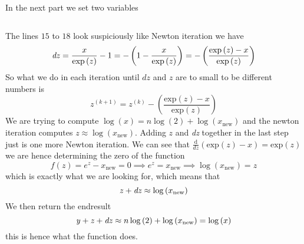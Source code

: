 \documentclass{article}
\begin{document}
\noindent In the next part we set two variables 
\begin{lstlisting}[language=C++,
                   directivestyle={\color{black}}
                   emph={int,char,double,float,unsigned},
                   emphstyle={\color{blue}}
                  ]

\end{lstlisting}
The lines $15$ to $18$ look suspiciously like Newton iteration we have
\begin{equation*}
    \text{\textit{dz}} = \frac{x}{\text{exp}\left(z\right)} - 1 = - \left(1-\frac{x}{\text{exp}\left(z\right)}\right) = -\left(\frac{\text{exp}\left(z\right) - x}{\text{exp}\left(z\right)}\right)
\end{equation*}
So what we do in each iteration until $dz$ and $z$ are to small to be different numbers is
\begin{equation*}
    z^{\left(k+1\right)} = z^{\left(k\right)} - \left(\frac{\text{exp}\left(z\right) - x}{\text{exp}\left(z\right)}\right)
\end{equation*}
We are trying to compute $\log\left(x\right) = n \log\left(2\right) + \log\left(x_{\text{new}}\right)$ and the newton iteration computes $z \approx \log\left(x_{\text{new}}\right)$. Adding $z$ and \textit{dz} together in the last step just is one more Newton iteration. We can see that $\frac{\mathrm{d}}{dz}\left(\text{exp}\left(z\right) - x\right) = \text{exp}\left(z\right)$ we are hence determining the zero of the function
\begin{equation*}
    f\left(z\right) = e^{z} - x_{\text{new}} = 0 \implies e^{z} = x_{\text{new}} \implies \log\left(x_{\text{new}}\right) = z
\end{equation*}
which is exactly what we are looking for, which means that 
\begin{equation*}
    \text{\textit{z}} + \text{\textit{dz}} \approx \log\left(x_{\text{new}}\right)
\end{equation*}
We then return the endresult
\begin{equation*}
    \text{\textit{y}} + \text{\textit{z}} + \text{\textit{dz}} \approx n\log\left(2\right) + \log\left(x_{\text{new}}\right) = \log\left(x\right)
\end{equation*}
this is hence what the function does.
\end{document}

